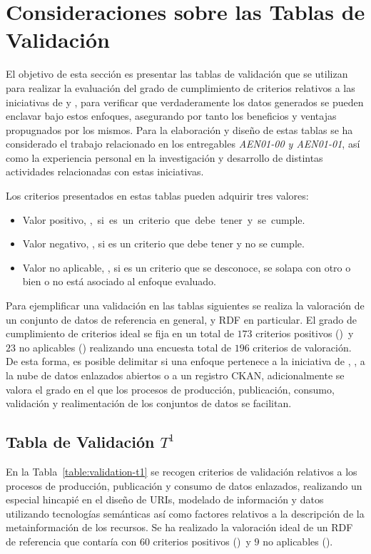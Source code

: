 \section{Consideraciones sobre las Tablas de Validación}
El objetivo de esta sección es presentar las tablas de validación que se utilizan para realizar 
la evaluación del grado de cumplimiento de criterios relativos a las iniciativas de 
\linkeddata y \opendata, para verificar que verdaderamente los datos generados se pueden enclavar 
bajo estos enfoques, asegurando por tanto los beneficios y ventajas propugnados por los mismos. Para la elaboración 
y diseño de estas tablas se ha considerado el trabajo relacionado en los entregables \textit{AEN01-00 y AEN01-01}, así 
como la experiencia personal en la investigación y desarrollo de distintas actividades relacionadas con estas iniciativas. 

Los criterios presentados en estas tablas pueden adquirir tres valores:
\begin{itemize}
 \item Valor positivo, \si, si es un criterio que debe tener y se cumple.
 \item Valor negativo, \no, si es un criterio que debe tener y no se cumple.
 \item Valor no aplicable, \na, si es un criterio que se desconoce, se solapa con otro o bien 
o no está asociado al enfoque evaluado.
\end{itemize}

Para ejemplificar una validación en las tablas siguientes se realiza la valoración de un conjunto 
de datos de referencia en general, y \datasets RDF en particular. El grado de cumplimiento de criterios 
ideal se fija en un total de $173$ criterios positivos (\si) y $23$ no aplicables (\na) realizando 
una encuesta total de $196$ criterios de valoración. De esta forma, es posible delimitar si una enfoque 
pertenece a la iniciativa de \opendata, \linkeddata, a la nube de datos enlazados abiertos o 
a un registro \gls{CKAN}, adicionalmente se valora el grado en el que los procesos de producción, publicación, 
consumo, validación y realimentación de los conjuntos de datos se facilitan. 

\subsection{Tabla de Validación $T^{1}$}
En la Tabla~\ref{table:validation-t1} se recogen criterios de validación relativos a los 
procesos de producción, publicación y consumo de datos enlazados, realizando un especial hincapié 
en el diseño de \gls{URI}s, modelado de información y datos utilizando tecnologías semánticas así como factores relativos a la 
descripción de la metainformación de los recursos. Se ha realizado la valoración ideal 
de un \dataset \gls{RDF} de referencia que contaría con $60$ criterios positivos (\si) y $9$ no aplicables 
(\na).

